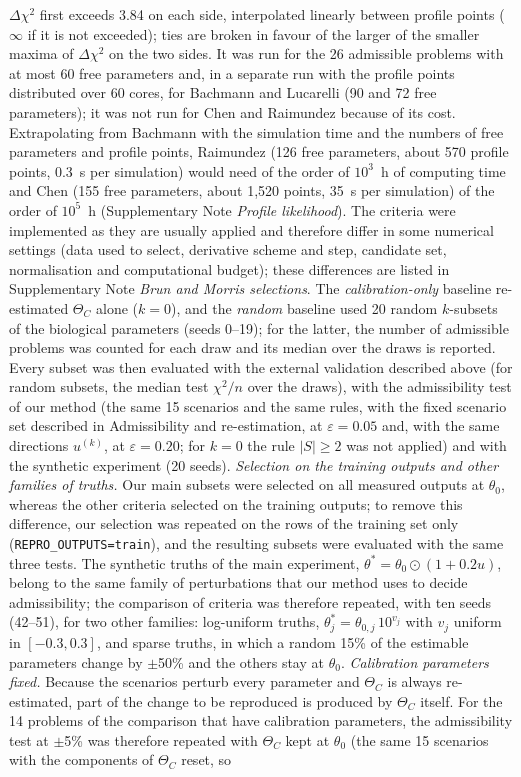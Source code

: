 \documentclass[pdflatex,sn-nature]{sn-jnl}
\theoremstyle{plain}
\begin{document}
$\Delta\chi^2$ first exceeds 3.84 on each side, interpolated linearly between profile points ($\infty$ if it is not exceeded); ties are broken in favour of the larger of the smaller maxima of $\Delta\chi^2$ on the two sides. It was run for the 26 admissible problems with at most 60 free parameters and, in a separate run with the profile points distributed over 60 cores, for Bachmann and Lucarelli (90 and 72 free parameters); it was not run for Chen and Raimundez because of its cost. Extrapolating from Bachmann with the simulation time and the numbers of free parameters and profile points, Raimundez (126 free parameters, about 570 profile points, 0.3~s per simulation) would need of the order of $10^3$~h of computing time and Chen (155 free parameters, about 1,520 points, 35~s per simulation) of the order of $10^5$~h (Supplementary Note \textit{Profile likelihood}). The criteria were implemented as they are usually applied and therefore differ in some numerical settings (data used to select, derivative scheme and step, candidate set, normalisation and computational budget); these differences are listed in Supplementary Note \textit{Brun and Morris selections}. The \emph{calibration-only} baseline re-estimated $\Theta_C$ alone ($k=0$), and the \emph{random} baseline used 20 random $k$-subsets of the biological parameters (seeds 0--19); for the latter, the number of admissible problems was counted for each draw and its median over the draws is reported. Every subset was then evaluated with the external validation described above (for random subsets, the median test $\chi^2/n$ over the draws), with the admissibility test of our method (the same 15 scenarios and the same rules, with the fixed scenario set described in Admissibility and re-estimation, at $\varepsilon=0.05$ and, with the same directions $u^{(k)}$, at $\varepsilon=0.20$; for $k=0$ the rule $|S|\ge2$ was not applied) and with the synthetic experiment (20 seeds). \label{met:comp-train}\emph{Selection on the training outputs and other families of truths.} Our main subsets were selected on all measured outputs at $\theta_0$, whereas the other criteria selected on the training outputs; to remove this difference, our selection was repeated on the rows of the training set only (\texttt{REPRO\_OUTPUTS=train}), and the resulting subsets were evaluated with the same three tests. The synthetic truths of the main experiment, $\theta^\ast=\theta_0\odot(1+0.2u)$, belong to the same family of perturbations that our method uses to decide admissibility; the comparison of criteria was therefore repeated, with ten seeds (42--51), for two other families: log-uniform truths, $\theta^\ast_j=\theta_{0,j}\,10^{v_j}$ with $v_j$ uniform in $[-0.3,0.3]$, and sparse truths, in which a random 15\% of the estimable parameters change by $\pm$50\% and the others stay at $\theta_0$. \label{met:comp-cal}\emph{Calibration parameters fixed.} Because the scenarios perturb every parameter and $\Theta_C$ is always re-estimated, part of the change to be reproduced is produced by $\Theta_C$ itself. For the 14 problems of the comparison that have calibration parameters, the admissibility test at $\pm$5\% was therefore repeated with $\Theta_C$ kept at $\theta_0$ (the same 15 scenarios with the components of $\Theta_C$ reset, so 
\end{document}
